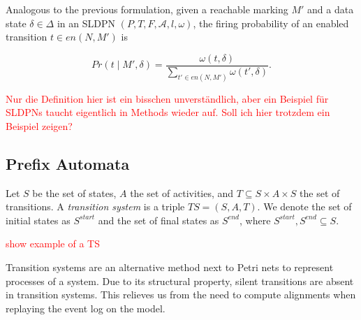 Analogous to the previous formulation, given a reachable marking $M'$ and a data state $\delta \in \Delta$ in an SLDPN $(P, T, F, \mathcal{A}, l, \omega)$, the firing probability of an enabled transition $t \in en(N, M')$ is

\[
    Pr(t \mid M', \delta) = \frac{\omega(t, \delta)}{\sum_{t' \in en(N, M')} \omega(t', \delta)}.
\]

\textcolor{red}{Nur die Definition hier ist ein bisschen unverständlich, aber ein Beispiel für SLDPNs taucht eigentlich in Methods wieder auf. Soll ich hier trotzdem ein Beispiel zeigen?}

\subsection{Prefix Automata} \label{subsec:transition_systems}

\begin{definition}
    Let $S$ be the set of states, $A$ the set of activities, and $T \subseteq S \times A \times S$ the set of transitions. A \emph{transition system} is a triple $\mathit{\mathit{TS}} = (S, A, T)$. We denote the set of initial states as $S^{start}$ and the set of final states as $S^{end}$, where $S^{start}, S^{end} \subseteq S$.
\end{definition}

\textcolor{red}{show example of a TS}

Transition systems are an alternative method next to Petri nets to represent processes of a system. Due to its structural property, silent transitions are absent in transition systems. This relieves us from the need to compute alignments when replaying the event log on the model.

